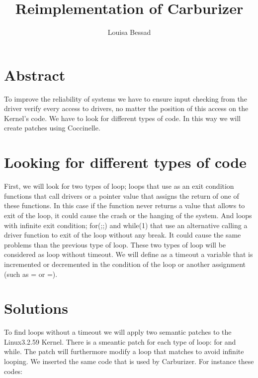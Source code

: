 \documentclass[11pt]{article}
\title{\fontsize{15pt}{10pt}\selectfont\textbf{Reimplementation of Carburizer}}
\author{Louisa Bessad}
\begin{document}
\maketitle

\section{Abstract}
To improve the reliability of systems we have to ensure input checking from the driver verify every access to drivers, no matter the position of this access on the Kernel's code. We have to look for different types of code. In this way we will create patches using Coccinelle.

\section{Looking for different types of code}
First, we will look for two types of loop; loops that use as an exit condition functions that call drivers or a pointer value that assigns the return of one of these functions. In this case if the function never returns a value that allows to exit of the loop, it could cause the crash or the hanging of the system. And loops with infinite exit condition; for(;;) and while(1) that use an alternative calling a driver function to exit of the loop without any break. It could cause the same problems than the previous type of loop. These two types of loop will be considered as loop without timeout. We will define as a timeout a variable that is incremented or decremented in the condition of the loop or another assignment (such as  \ll= or \gg=).






\section{Solutions}
To find loops without a timeout we will apply two semantic patches to the Linux3.2.59 Kernel. There is a smeantic patch for each type of loop: for and while. The patch will furthermore modify a loop that matches to avoid infinite looping. We inserted the same code that is used by Carburizer. For instance these codes:

\vspace*{5mm}
\lstset{numbers=left,firstnumber=1,numberfirstline=true}
\begin{lstlisting}[language=C]

\end{lstlisting}
\end{document}
